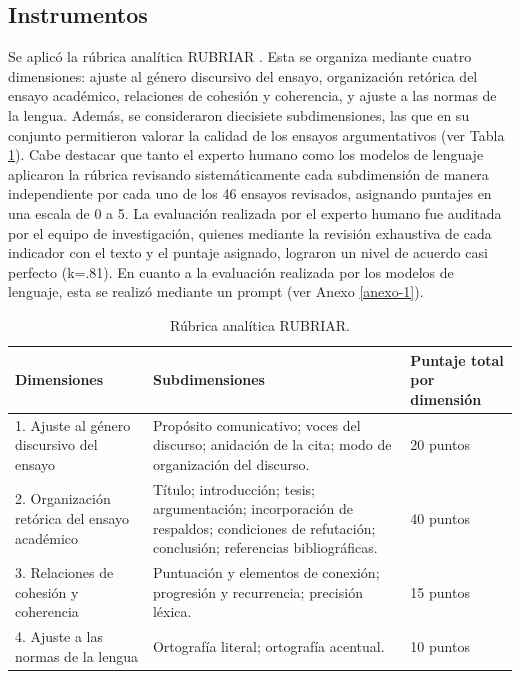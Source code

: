 \documentclass[spanish]{textolivre}
\begin{document}
\subsection{Instrumentos}
Se aplicó la rúbrica analítica RUBRIAR \cite{kloss2024}. Esta se organiza mediante cuatro dimensiones: ajuste al género discursivo del ensayo, organización retórica del ensayo académico, relaciones de cohesión y coherencia, y ajuste a las normas de la lengua. Además, se consideraron diecisiete subdimensiones, las que en su conjunto permitieron valorar la calidad de los ensayos argumentativos (ver Tabla \ref{tab-1}). Cabe destacar que tanto el experto humano como los modelos de lenguaje aplicaron la rúbrica revisando sistemáticamente cada subdimensión de manera independiente por cada uno de los 46 ensayos revisados, asignando puntajes en una escala de 0 a 5. La evaluación realizada por el experto humano fue auditada por el equipo de investigación, quienes mediante la revisión exhaustiva de cada indicador con el texto y el puntaje asignado, lograron un nivel de acuerdo casi perfecto (k=.81). En cuanto a la evaluación realizada por los modelos de lenguaje, esta se realizó mediante un prompt (ver Anexo \ref{anexo-1}).

\begin{table}[h!]
\centering
\begin{threeparttable}
\caption{Rúbrica analítica RUBRIAR.}\label{tab-1}
\begin{tabular}{p{3.5cm} p{7.2cm} p{2.5cm}}
\toprule
Dimensiones & Subdimensiones & Puntaje total por dimensión \\
\midrule
1. Ajuste al género discursivo del ensayo & Propósito comunicativo; voces del discurso; anidación de la cita; modo de organización del discurso. & 20 puntos \\

2. Organización retórica del ensayo académico & Título; introducción; tesis; argumentación; incorporación de respaldos; condiciones de refutación; conclusión; referencias bibliográficas. & 40 puntos \\

3. Relaciones de cohesión y coherencia & Puntuación y elementos de conexión; progresión y recurrencia; precisión léxica. & 15 puntos \\

4. Ajuste a las normas de la lengua & Ortografía literal; ortografía acentual. & 10 puntos \\
\bottomrule
\end{tabular}
\end{threeparttable}
\end{table}
\end{document}
